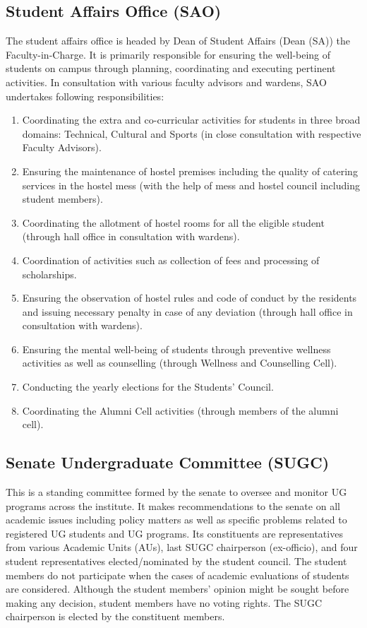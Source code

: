 \documentclass[a4paper, 12pt]{article}
\begin{document}
\subsection{Student Affairs Office (SAO)}

The student affairs office is headed by Dean of Student Affairs (Dean (SA)) the Faculty-in-Charge. It is primarily responsible for ensuring the well-being of students on campus through planning, coordinating and executing pertinent activities. In consultation with various faculty advisors and wardens, SAO undertakes following responsibilities:

\begin{enumerate}
	\item Coordinating the extra and co-curricular activities for students in three broad domains: Technical, Cultural and Sports (in close consultation with respective Faculty Advisors).
	\item Ensuring the maintenance of hostel premises including the quality of catering services in the hostel mess (with the help of mess and hostel council including student members).
	\item Coordinating the allotment of hostel rooms for all the eligible student (through hall office in consultation with wardens).
	\item Coordination of activities such as collection of fees and processing of scholarships.
	\item Ensuring the observation of hostel rules and code of conduct by the residents and issuing necessary penalty in case of any deviation (through hall office in consultation with wardens).
	\item Ensuring the mental well-being of students through preventive wellness activities as well as counselling (through Wellness and Counselling Cell).
	\item Conducting the yearly elections for the Students’ Council.
	\item Coordinating the Alumni Cell activities (through members of the alumni cell).
\end{enumerate}

\subsection{Senate Undergraduate Committee (SUGC)}

This is a standing committee formed by the senate to oversee and monitor UG programs across the institute. It makes recommendations to the senate on all academic issues including policy matters as well as specific problems related to registered UG students and UG programs. Its constituents are representatives from various Academic Units (AUs), last SUGC chairperson (ex-officio), and four student representatives elected/nominated by the student council. The student members do not participate when the cases of academic evaluations of students are considered. Although the student members' opinion might be sought before making any decision, student members have no voting rights. The SUGC chairperson is elected by the constituent members. 
\end{document}

